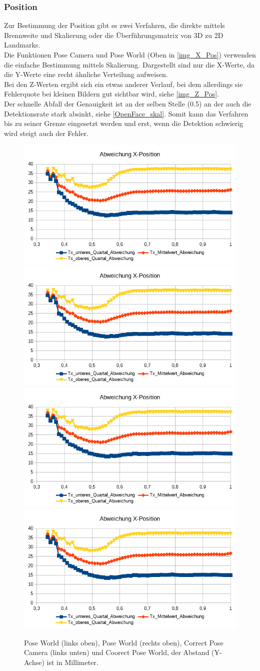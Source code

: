 \subsubsection{Position}
Zur Bestimmung der Position gibt es zwei Verfahren, die direkte mittels Brennweite und Skalierung oder die Überführungsmatrix von 3D zu 2D Landmarks.\\
Die Funktionen Pose Camera und Pose World (Oben in \autoref{img_X_Pos}) verwenden die einfache Bestimmung mittels Skalierung. Dargestellt sind nur die X-Werte, da die Y-Werte eine recht ähnliche Verteilung aufweisen.\\
Bei den Z-Werten ergibt sich ein etwas anderer Verlauf, bei dem allerdings sie Fehlerquote bei kleinen Bildern gut sichtbar wird, siehe \autoref{img_Z_Pos}.\\
Der schnelle Abfall der Genauigkeit ist an der selben Stelle (0.5) an der auch die Detektionsrate stark absinkt, siehe \autoref{OpenFace_skal}. Somit kann das Verfahren bis zu seiner Grenze eingesetzt werden und erst, wenn die Detektion schwierig wird steigt auch der Fehler.
\begin{figure}
	\centering
	\includegraphics[width=0.45\linewidth]{tabelle/X_Pos_PC}
	\includegraphics[width=0.45\linewidth]{tabelle/X_Pos_PW}
	\includegraphics[width=0.45\linewidth]{tabelle/X_Pos_CPC}
	\includegraphics[width=0.45\linewidth]{tabelle/X_Pos_CPW}
	\caption{Pose World (links oben), Pose World (rechts oben), Correct Pose Camera (links unten) und Coorect Pose World, der Abstand (Y-Achse) ist in Millimeter.}
	\label{img_X_Pos}
\end{figure}
